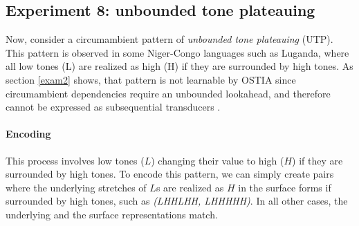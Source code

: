 \begin{table}[h!]
\centering
{}
\caption{Results of OSTIA learning vowel and consonant harmonies with blocking.}
\end{table}



\subsection{Experiment 8: unbounded tone plateauing}

Now, consider a circumambient pattern of \emph{unbounded tone plateauing} (UTP).
This pattern is observed in some Niger-Congo languages such as Luganda, where all low tones (L) are realized as high (H) if they are surrounded by high tones.
As section \ref{exam2} shows, that pattern is not learnable by OSTIA since circumambient dependencies require an unbounded lookahead, and therefore cannot be expressed as subsequential transducers \citep{Jardine2016}.

\paragraph{Encoding}
This process involves low tones ($L$) changing their value to high ($H$) if they are surrounded by high tones.
To encode this pattern, we can simply create pairs where the underlying stretches of $L$s are realized as $H$ in the surface forms if surrounded by high tones, such as \emph{(LHHLHH, LHHHHH)}.
In all other cases, the underlying and the surface representations match.

